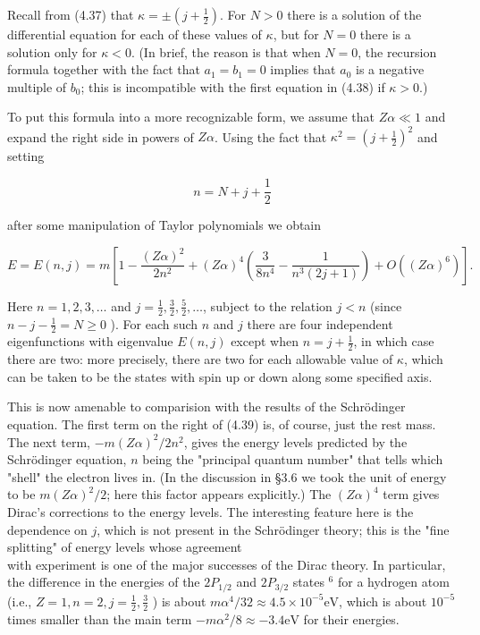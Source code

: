 \documentclass[10pt, letterpaper]{article}
\begin{document}
Recall from (4.37) that $\kappa= \pm\left(j+\frac{1}{2}\right)$. For $N>0$ there is a solution of the differential equation for each of these values of $\kappa$, but for $N=0$ there is a solution only for $\kappa<0$. (In brief, the reason is that when $N=0$, the recursion formula together with the fact that $a_{1}=b_{1}=0$ implies that $a_{0}$ is a negative multiple of $b_{0}$; this is incompatible with the first equation in (4.38) if $\kappa>0$.)

To put this formula into a more recognizable form, we assume that $Z \alpha \ll 1$ and expand the right side in powers of $Z \alpha$. Using the fact that $\kappa^{2}=\left(j+\frac{1}{2}\right)^{2}$ and setting

$$
n=N+j+\frac{1}{2}
$$

after some manipulation of Taylor polynomials we obtain

$$
E=E(n, j)=m\left[1-\frac{(Z \alpha)^{2}}{2 n^{2}}+(Z \alpha)^{4}\left(\frac{3}{8 n^{4}}-\frac{1}{n^{3}(2 j+1)}\right)+O\left((Z \alpha)^{6}\right)\right] .
$$

Here $n=1,2,3, \ldots$ and $j=\frac{1}{2}, \frac{3}{2}, \frac{5}{2}, \ldots$, subject to the relation $j<n$ (since $n-j-\frac{1}{2}=N \geq 0$ ). For each such $n$ and $j$ there are four independent eigenfunctions with eigenvalue $E(n, j)$ except when $n=j+\frac{1}{2}$, in which case there are two: more precisely, there are two for each allowable value of $\kappa$, which can be taken to be the states with spin up or down along some specified axis.

This is now amenable to comparision with the results of the Schrödinger equation. The first term on the right of (4.39) is, of course, just the rest mass. The next term, $-m(Z \alpha)^{2} / 2 n^{2}$, gives the energy levels predicted by the Schrödinger equation, $n$ being the "principal quantum number" that tells which "shell" the electron lives in. (In the discussion in §3.6 we took the unit of energy to be $m(Z \alpha)^{2} / 2$; here this factor appears explicitly.) The $(Z \alpha)^{4}$ term gives Dirac's corrections to the energy levels. The interesting feature here is the dependence on $j$, which is not present in the Schrödinger theory; this is the "fine splitting" of energy levels whose agreement\\
with experiment is one of the major successes of the Dirac theory. In particular, the difference in the energies of the $2 P_{1 / 2}$ and $2 P_{3 / 2}$ states ${ }^{6}$ for a hydrogen atom (i.e., $Z=1, n=2, j=\frac{1}{2}, \frac{3}{2}$ ) is about $m \alpha^{4} / 32 \approx 4.5 \times 10^{-5} \mathrm{eV}$, which is about $10^{-5}$ times smaller than the main term $-m \alpha^{2} / 8 \approx-3.4 \mathrm{eV}$ for their energies.
\end{document}
